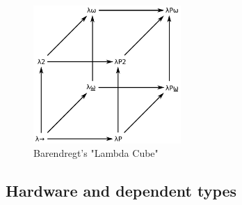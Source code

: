             \begin{figure}[h]
                \centerline{\includegraphics[width=0.5\textwidth]{imgs/lambda-cube.pdf}}
                \caption{Barendregt's "Lambda Cube" \label{fig:lambda-cube}}
            \end{figure}


        \subsection{Hardware and dependent types}
        \label{sec:hardware-dtp}

